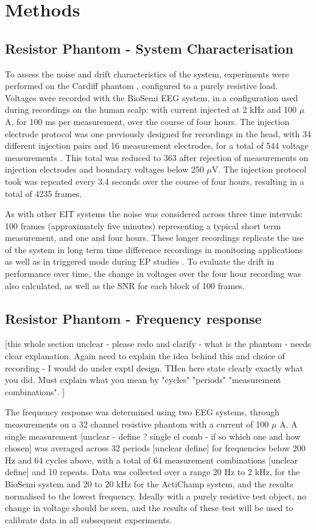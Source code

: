 \section{Methods}
\subsection{Resistor Phantom - System Characterisation}

To assess the noise and drift characteristics of the system, experiments were performed on the Cardiff phantom \cite{griffiths1995cole}, configured to a purely resistive load. Voltages were recorded with the BioSemi EEG system, in a configuration used during recordings on the human scalp: with current injected at 2 kHz and 100 $\mu$ A, for 100 ms per measurement, over the course of four hours. The injection electrode protocol was one previously designed for recordings in the head, with 34 different injection pairs and 16 measurement electrodes, for a total of 544 voltage measurements \cite{Fabrizi2009}. This total was reduced to 363 after rejection of measurements on injection electrodes and boundary voltages below 250 $\mu$V. The injection protocol took was repeated every 3.4 seconds over the course of four hours, resulting in a total of 4235 frames. 

As with other EIT systems \cite{oh2007multi} the noise was considered across three time intervals: 100 frames (approximately five minutes) representing a typical short term measurement, and one and four hours. These longer recordings replicate the use of the system in long term time difference recordings in monitoring applications \cite{fu2014use} \cite{adler2012whither} as well as in triggered mode during EP studies \cite{Aristovich_2016}. To evaluate the drift in performance over time, the change in voltages over the four hour recording was also calculated, as well as the SNR for each block of 100 frames. 

\subsection{Resistor Phantom - Frequency response}

[this whole section unclear - please redo and clarify - what is the phantom - needs clear explanation. Again need to explain the idea behind this and choice of recording - I would do under exptl design. THen here state clearly exactly what you did.  Must explain what you mean by "cycles" "periods" "measurement combinations". ] 

The frequency response was determined using two EEG systems, through measurements on a 32 channel resistive phantom with a current of 100 $\mu$ A. A single measurement [unclear - define ? single el comb - if so which one and how chosen] was averaged across 32 periods [unclear define] for frequencies below 200 Hz and 64 cycles above, with a total of 64 measurement combinations [unclear define] and 10 repeats. Data was collected over a range 20 Hz to 2 kHz, for the BioSemi system and 20 to 20 kHz for the ActiChamp system, and the results normalised to the lowest frequency.  Ideally with a purely resistive test object, no change in voltage should be seen, and the results of these test will be used to calibrate data in all subsequent experiments.